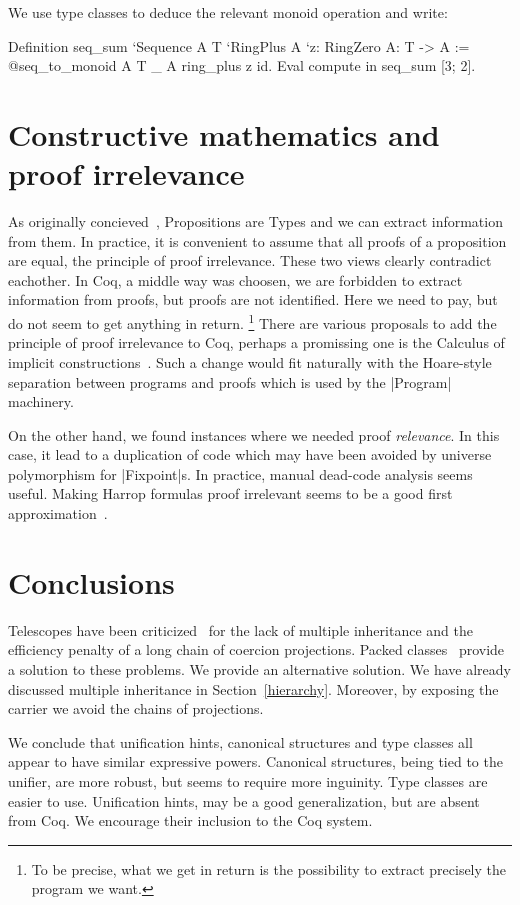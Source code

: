 \documentclass[a4paper,10pt, runningheads]{llncs}
\begin{document}
We use type classes to deduce the relevant monoid operation and write:
\begin{code}
Definition seq_sum
  `{Sequence A T} `{RingPlus A} `{z: RingZero A}: T -> A
  := @seq_to_monoid A T _ A ring_plus z id.
  Eval compute in seq_sum [3; 2].
\end{code}

\section{Constructive mathematics and proof irrelevance}\label{explicit}
As originally concieved~\cite{ITT,CMCP}, Propositions are Types and we can extract information from
them. In practice, it is convenient to assume that all proofs of a proposition are equal, the
principle of proof irrelevance. These two views clearly contradict eachother. In Coq, a middle way
was choosen, we are forbidden to extract information from proofs, but proofs are not identified.
Here we need to pay, but do not seem to get anything in return.%
\footnote{To be precise, what we get in return is the possibility to extract precisely the program
we want.}
There are various proposals to add the principle of proof irrelevance to Coq, perhaps a
promissing one is the Calculus of implicit
constructions~\cite{miquel2001implicit,barras2008implicit}. Such a change would fit naturally with
the Hoare-style separation between programs and proofs which is used by the |Program| machinery.

On the other hand, we found instances where we needed proof \emph{relevance}. In this case, it lead
to a duplication of code which may have been avoided by universe polymorphism for |Fixpoint|s. In
practice, manual dead-code analysis seems useful. Making Harrop formulas proof irrelevant seems to
be a good first approximation~\cite{lcf:spi:03}.

\section{Conclusions}
Telescopes have been criticized~\cite{Packed} for the lack of multiple inheritance and
the efficiency penalty of a long chain of coercion projections. Packed classes~\cite{Packed} provide
a solution to these problems. We provide an alternative solution. We have already
discussed multiple inheritance in Section~\ref{hierarchy}. Moreover, by exposing the
carrier we avoid the chains of projections.

We conclude that unification hints, canonical structures and type classes all appear to have
similar expressive powers. Canonical structures, being tied to the unifier, are more robust, but
seems to require more inguinity. Type classes are easier to use. Unification hints, may be a
good generalization, but are absent from Coq. We encourage their inclusion to the
Coq system.
\end{document}
